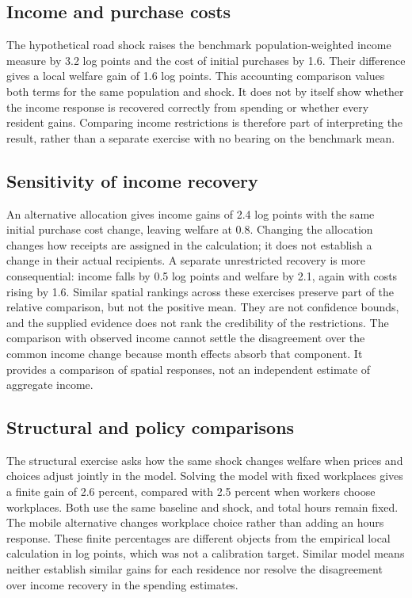 \subsection{Income and purchase costs}
The hypothetical road shock raises the benchmark population-weighted income
measure by 3.2 log points and the cost of initial purchases by 1.6. Their difference
gives a local welfare gain of 1.6 log points. This accounting comparison values
both terms for the same population and shock. It does not by itself show whether
the income response is recovered correctly from spending or whether every
resident gains. Comparing income restrictions is therefore part of interpreting
the result, rather than a separate exercise with no bearing on the benchmark mean.

\subsection{Sensitivity of income recovery}
An alternative allocation gives income gains of 2.4 log points with the same
initial purchase cost change, leaving welfare at 0.8. Changing the allocation changes
how receipts are assigned in the calculation; it does not establish a change in
their actual recipients. A separate unrestricted recovery is more consequential:
income falls by 0.5 log points and welfare by 2.1, again with costs rising by 1.6.
Similar spatial rankings across these exercises preserve part of the relative
comparison, but not the positive mean. They are not confidence bounds, and the
supplied evidence does not rank the credibility of the restrictions. The
comparison with observed income cannot settle the disagreement over the common income
change because month effects absorb that component. It provides a comparison
of spatial responses, not an independent estimate of aggregate income.

\subsection{Structural and policy comparisons}
The structural exercise asks how the same shock changes welfare when prices
and choices adjust jointly in the model. Solving the model with fixed workplaces
gives a finite gain of 2.6 percent, compared with 2.5 percent when workers choose
workplaces. Both use the same baseline and shock, and total hours remain fixed.
The mobile alternative changes workplace choice rather than adding an hours
response. These finite percentages are different objects from the empirical
local calculation in log points, which was not a calibration target. Similar model
means neither establish similar gains for each residence nor resolve the
disagreement over income recovery in the spending estimates.

